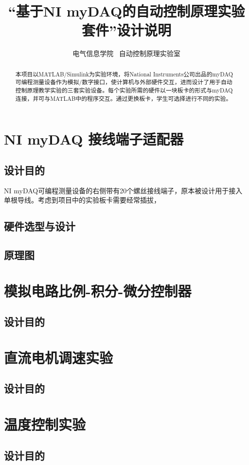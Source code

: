 \documentclass[11pt,a4paper]{article}
\title{``基于NI myDAQ的自动控制原理实验套件''设计说明}
\begin{document}
\author{电气信息学院 \ 自动控制原理实验室}

\maketitle

\begin{abstract}
  本项目以MATLAB/Simulink为实验环境，将National Instruments公司出品的myDAQ可编程测量设备作为模拟/数字接口，使计算机与外部硬件交互，进而设计了用于自动控制原理教学实验的三套实验设备。每个实验所需的硬件以一块板卡的形式与myDAQ连接，并可与MATLAB中的程序交互。通过更换板卡，学生可选择进行不同的实验。
\end{abstract}

\tableofcontents

\section{NI myDAQ 接线端子适配器}

\subsection{设计目的}
NI myDAQ可编程测量设备的右侧带有20个螺丝接线端子，原本被设计用于接入单根导线。考虑到项目中的实验板卡需要经常插拔，


\subsection{硬件选型与设计}

\subsection{原理图}

\section{模拟电路比例-积分-微分控制器}

\subsection{设计目的}

\section{直流电机调速实验}

\subsection{设计目的}

\section{温度控制实验}

\subsection{设计目的}
\end{document}
